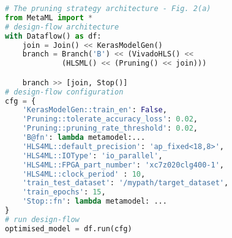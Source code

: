 \begin{lstlisting}[float=tp,emph={with},emphstyle={\bfseries}, language=Python, caption=The implementation of the pruning strategy using our framework., label=code:strategy]
# The pruning strategy architecture - Fig. 2(a)
from MetaML import * 
# design-flow architecture
with Dataflow() as df:
    join = Join() << KerasModelGen() 
    branch = Branch('B') << (VivadoHLS() << 
             (HLSML() << (Pruning() << join)))

    branch >> [join, Stop()]
# design-flow configuration
cfg = {
    'KerasModelGen::train_en': False,
    'Pruning::tolerate_accuracy_loss': 0.02,
    'Pruning::pruning_rate_threshold': 0.02,
    'B@fn': lambda metamodel:...
    'HLS4ML::default_precision': 'ap_fixed<18,8>',
    'HLS4ML::IOType': 'io_parallel',
    'HLS4ML::FPGA_part_number': 'xc7z020clg400-1',
    'HLS4ML::clock_period' : 10,
    'train_test_dataset': '/mypath/target_dataset',
    'train_epochs': 15,
    'Stop::fn': lambda metamodel: ... 
}
# run design-flow  
optimised_model = df.run(cfg)
\end{lstlisting}
